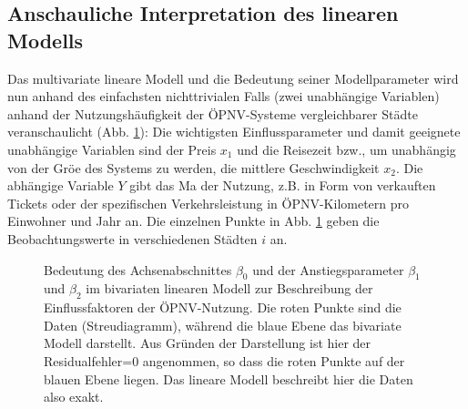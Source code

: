 




\subsection{Anschauliche Interpretation des linearen Modells}

Das multivariate  lineare Modell und die Bedeutung seiner Modellparameter
wird nun anhand des einfachsten nichttrivialen Falls (zwei
unabh\"angige Variablen) anhand der Nutzungsh\"aufigkeit der
\"OPNV-Systeme vergleichbarer St\"adte veranschaulicht
(Abb. \ref{fig:linRegrBivar}): Die wichtigsten Einflussparameter und
damit geeignete unabh\"angige Variablen sind
der Preis $x_1$ und die Reisezeit bzw., um unabh\"angig von der Gr\"o\3e des
Systems zu werden, die mittlere Geschwindigkeit $x_2$. Die abh\"angige
Variable $Y$ gibt das Ma\3 der Nutzung, z.B. in Form von verkauften
Tickets oder der spezifischen Verkehrsleistung in \"OPNV-Kilometern
pro Einwohner und Jahr  an. Die
einzelnen Punkte in Abb. \ref{fig:linRegrBivar} geben die
Beobachtungswerte in verschiedenen St\"adten $i$ an.

\begin{figure}
\caption{\label{fig:linRegrBivar} Bedeutung des Achsenabschnittes
$\beta_0$ und der
Anstiegsparameter $\beta_1$ und $\beta_2$ im bivariaten linearen
Modell zur Beschreibung der Einflussfaktoren der \"OPNV-Nutzung. Die
roten Punkte sind die Daten (Streudiagramm), 
w\"ahrend die  blaue Ebene das bivariate
Modell darstellt. Aus Gr\"unden der Darstellung ist hier der
Residualfehler=0 angenommen, so dass die roten Punkte auf der blauen Ebene
liegen. Das lineare Modell beschreibt hier die Daten also exakt.}
\end{figure}

